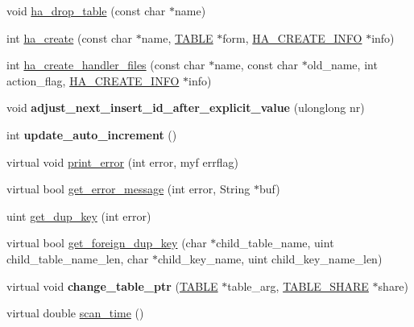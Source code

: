 \begin{DoxyCompactItemize}
\item 
void \mbox{\hyperlink{classhandler_a6bcc37ec84386f5d6cc86448781666cb}{ha\+\_\+drop\+\_\+table}} (const char $\ast$name)
\item 
int \mbox{\hyperlink{classhandler_a14af5825a427ba6baac74b13223637f8}{ha\+\_\+create}} (const char $\ast$name, \mbox{\hyperlink{structTABLE}{T\+A\+B\+LE}} $\ast$form, \mbox{\hyperlink{structst__ha__create__information}{H\+A\+\_\+\+C\+R\+E\+A\+T\+E\+\_\+\+I\+N\+FO}} $\ast$info)
\item 
int \mbox{\hyperlink{classhandler_a722462d7e71059a8ed1f43d0fb28366b}{ha\+\_\+create\+\_\+handler\+\_\+files}} (const char $\ast$name, const char $\ast$old\+\_\+name, int action\+\_\+flag, \mbox{\hyperlink{structst__ha__create__information}{H\+A\+\_\+\+C\+R\+E\+A\+T\+E\+\_\+\+I\+N\+FO}} $\ast$info)
\item 
\mbox{\label{classhandler_ad4c090210fefb7e95d885688f5717028}} 
void {\bfseries adjust\+\_\+next\+\_\+insert\+\_\+id\+\_\+after\+\_\+explicit\+\_\+value} (ulonglong nr)
\item 
\mbox{\label{classhandler_a8a7d2f9da11425e388640206b4d22241}} 
int {\bfseries update\+\_\+auto\+\_\+increment} ()
\item 
virtual void \mbox{\hyperlink{classhandler_afda4f1390385a4dc0bfd2981fee23e6c}{print\+\_\+error}} (int error, myf errflag)
\item 
virtual bool \mbox{\hyperlink{classhandler_afce8ffd064ce683481494c7503ef820c}{get\+\_\+error\+\_\+message}} (int error, String $\ast$buf)
\item 
uint \mbox{\hyperlink{classhandler_ad5eede0999f8273864faa40c5e181793}{get\+\_\+dup\+\_\+key}} (int error)
\item 
virtual bool \mbox{\hyperlink{classhandler_a20878b1fb8d31b91dbf53ac963d90f78}{get\+\_\+foreign\+\_\+dup\+\_\+key}} (char $\ast$child\+\_\+table\+\_\+name, uint child\+\_\+table\+\_\+name\+\_\+len, char $\ast$child\+\_\+key\+\_\+name, uint child\+\_\+key\+\_\+name\+\_\+len)
\item 
\mbox{\label{classhandler_a2b117a976fc9423d2337da59f35d128c}} 
virtual void {\bfseries change\+\_\+table\+\_\+ptr} (\mbox{\hyperlink{structTABLE}{T\+A\+B\+LE}} $\ast$table\+\_\+arg, \mbox{\hyperlink{structTABLE__SHARE}{T\+A\+B\+L\+E\+\_\+\+S\+H\+A\+RE}} $\ast$share)
\item 
virtual double \mbox{\hyperlink{classhandler_a65f8e5188e2bd9636a564bbc0c3fef86}{scan\+\_\+time}} ()

\end{DoxyCompactItemize}
